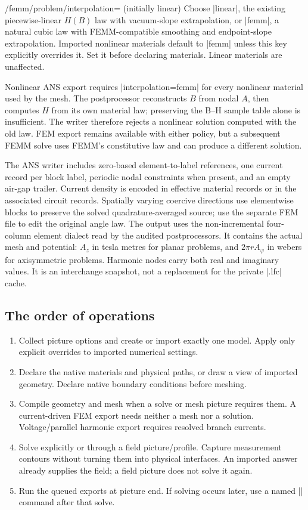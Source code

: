 \begin{key}{/femm/problem/interpolation= (initially linear)}
Choose |linear|, the existing piecewise-linear $H(B)$ law with vacuum-slope
extrapolation, or |femm|, a natural cubic law with FEMM-compatible smoothing and
endpoint-slope extrapolation. Imported nonlinear materials default to |femm|
unless this key explicitly overrides it. Set it before declaring materials.
Linear materials are unaffected.
\end{key}

Nonlinear ANS export requires |interpolation=femm| for every nonlinear material
used by the mesh. The postprocessor reconstructs $B$ from nodal $A$, then computes
$H$ from its own material law; preserving the B--H sample table alone is insufficient.
The writer therefore rejects a nonlinear solution computed with the old law.
FEM export remains available with either policy, but a subsequent FEMM solve
uses FEMM's constitutive law and can produce a different solution.

The ANS writer includes zero-based element-to-label references, one current
record per block label, periodic nodal constraints when present, and an empty
air-gap trailer. Current density is encoded in effective material records or
in the associated circuit records. Spatially varying coercive directions use
elementwise blocks to preserve the solved quadrature-averaged source; use the
separate FEM file to edit the original angle law. The output uses the
non-incremental four-column element dialect read by the audited postprocessors.
It contains the actual mesh and potential: $A_z$ in tesla metres for planar
problems, and $2\pi rA_\varphi$ in webers for axisymmetric problems. Harmonic
nodes carry both real and imaginary values. It is an interchange snapshot,
not a replacement for the private |.lfc| cache.

\subsection{The order of operations}

\begin{enumerate}
\item Collect picture options and create or import exactly one model. Apply only
      explicit overrides to imported numerical settings.
\item Declare the native materials and physical paths, or draw a view of imported
      geometry. Declare native boundary conditions before meshing.
\item Compile geometry and mesh when a solve or mesh picture requires them.
      A current-driven FEM export needs neither a mesh nor a solution.
      Voltage/parallel harmonic export requires resolved branch currents.
\item Solve explicitly or through a field picture/profile. Capture measurement
      contours without turning them into physical interfaces. An imported answer
      already supplies the field; a field picture does not solve it again.
\item Run the queued exports at picture end. If solving occurs later, use a
      named |\femmexport| command after that solve.
\end{enumerate}

